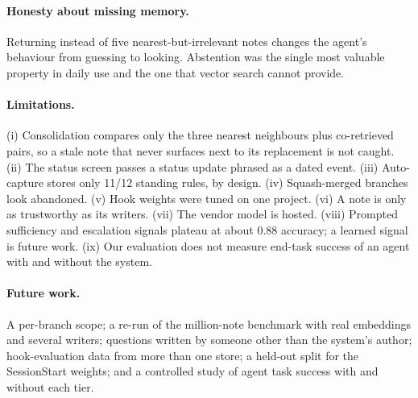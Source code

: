 \paragraph{Honesty about missing memory.} Returning  instead of five nearest-but-irrelevant notes changes the agent's behaviour from guessing to looking. Abstention was the single most valuable property in daily use and the one that vector search cannot provide.

\paragraph{Limitations.} (i) Consolidation compares only the three nearest neighbours plus co-retrieved pairs, so a stale note that never surfaces next to its replacement is not caught. (ii) The status screen passes a status update phrased as a dated event. (iii) Auto-capture stores only 11/12 standing rules, by design. (iv) Squash-merged branches look abandoned. (v) Hook weights were tuned on one project. (vi) A note is only as trustworthy as its writers. (vii) The vendor model is hosted. (viii) Prompted sufficiency and escalation signals plateau at about 0.88 accuracy; a learned signal is future work. (ix) Our evaluation does not measure end-task success of an agent with and without the system.

\paragraph{Future work.} A per-branch scope; a re-run of the million-note benchmark with real embeddings and several writers; questions written by someone other than the system's author; hook-evaluation data from more than one store; a held-out split for the SessionStart weights; and a controlled study of agent task success with and without each tier.
